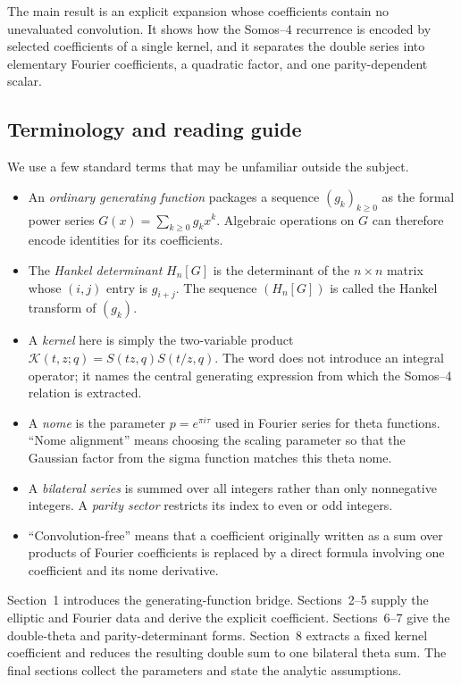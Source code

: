 \documentclass[11pt]{article}
\numberwithin{equation}{section}
\begin{document}
The main result is an explicit expansion whose coefficients contain no unevaluated convolution.  It shows how the Somos--4 recurrence is encoded by selected coefficients of a single kernel, and it separates the double series into elementary Fourier coefficients, a quadratic factor, and one parity-dependent scalar.

\subsection*{Terminology and reading guide}
We use a few standard terms that may be unfamiliar outside the subject.
\begin{itemize}
\item An \emph{ordinary generating function} packages a sequence $(g_k)_{k\ge0}$ as the formal power series $G(x)=\sum_{k\ge0}g_kx^k$.  Algebraic operations on $G$ can therefore encode identities for its coefficients.
\item The \emph{Hankel determinant} $H_n[G]$ is the determinant of the $n\times n$ matrix whose $(i,j)$ entry is $g_{i+j}$.  The sequence $(H_n[G])$ is called the Hankel transform of $(g_k)$.
\item A \emph{kernel} here is simply the two-variable product $\mathcal K(t,z;q)=S(tz,q)S(t/z,q)$.  The word does not introduce an integral operator; it names the central generating expression from which the Somos--4 relation is extracted.
\item A \emph{nome} is the parameter $p=e^{\pi i\tau}$ used in Fourier series for theta functions.  ``Nome alignment'' means choosing the scaling parameter so that the Gaussian factor from the sigma function matches this theta nome.
\item A \emph{bilateral series} is summed over all integers rather than only nonnegative integers.  A \emph{parity sector} restricts its index to even or odd integers.
\item ``Convolution-free'' means that a coefficient originally written as a sum over products of Fourier coefficients is replaced by a direct formula involving one coefficient and its nome derivative.
\end{itemize}
Section~1 introduces the generating-function bridge.  Sections~2--5 supply the elliptic and Fourier data and derive the explicit coefficient.  Sections~6--7 give the double-theta and parity-determinant forms.  Section~8 extracts a fixed kernel coefficient and reduces the resulting double sum to one bilateral theta sum.  The final sections collect the parameters and state the analytic assumptions.
\end{document}
